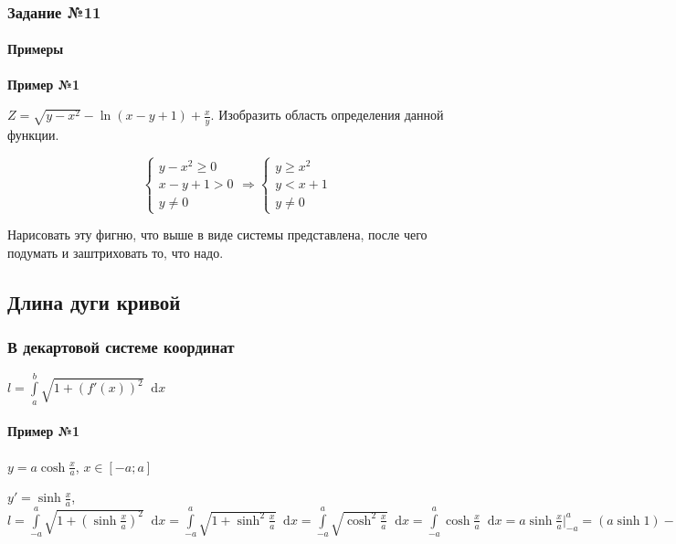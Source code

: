 \documentclass{article}
\newcommand*\diff{\mathop{}\!\mathrm{d}}
\begin{document}
\subsubsection{Задание №11}

\paragraph{Примеры}

\textbf{Пример №1}

$Z = \sqrt{y - x^2} - \ln (x - y + 1) + \frac{x}{y}$. Изобразить область определения данной функции.

\begin{equation}
    \begin{cases}
        y - x^2 \ge 0 \\
        x - y + 1 > 0 \\
        y \ne 0
    \end{cases} \Longrightarrow
    \begin{cases}
        y \ge x^2 \\
        y < x + 1 \\
        y \ne 0
    \end{cases}
\end{equation}

Нарисовать эту фигню, что выше в виде системы представлена, после чего подумать и заштриховать то, что надо.

\subsection{Длина дуги кривой}

\subsubsection{В декартовой системе координат}

$l = \int\limits_{a}^{b} \sqrt{1 + (f'(x))^2} \diff x$

\paragraph{Пример №1}

$y = a \cosh \frac{x}{a}$, $x \in [-a; a]$

$y' = \sinh \frac{x}{a}$, $l = \int\limits_{-a}^{a} \sqrt{1 + (\sinh \frac{x}{a})^2} \diff x = \int\limits_{-a}^{a} \sqrt{1 + \sinh^2 \frac{x}{a}} \diff x = \int\limits_{-a}^{a} \sqrt{\cosh^2 \frac{x}{a}} \diff x = \int\limits_{-a}^{a} \cosh \frac{x}{a} \diff x = a \sinh \frac{x}{a} \bigg|_{-a}^{a} = (a \sinh 1) - (a \sinh (-1)) = 2 a \sinh 1$
\end{document}
